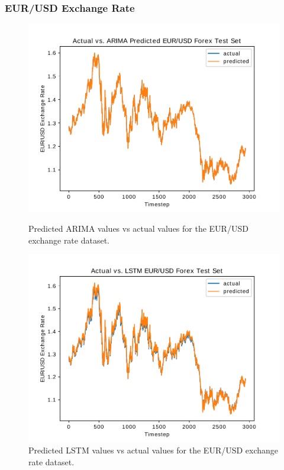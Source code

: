 \documentclass{article}
\begin{document}
\subsubsection{EUR/USD Exchange Rate}
\begin{figure}
\centering
{}
	\centering
  \includegraphics[scale=0.28]{imgs/arima_results_eurusd.pdf}
  \caption{Predicted ARIMA values vs actual values for the EUR/USD exchange rate dataset.}\label{fig:eurusd_graph_arima}
\endminipage\hfill
{}
	\centering
  \includegraphics[scale=0.28]{imgs/lstm_results_eurusd.pdf}
  \caption{Predicted LSTM values vs actual values for the EUR/USD exchange rate dataset.}\label{fig:eurusd_graph_lstm}
\endminipage\hfill

\end{figure}
\end{document}
